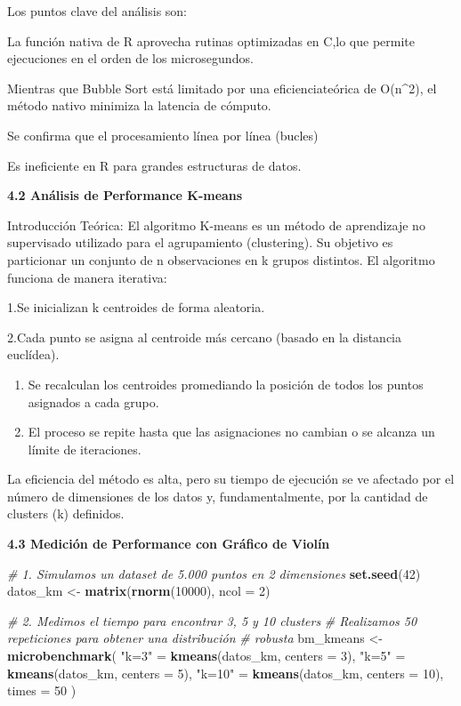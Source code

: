 \documentclass[runningheads]{llncs}
\newenvironment{Shaded}{\begin{snugshade}}{\end{snugshade}}
\newcommand{\AttributeTok}[1]{\textcolor[rgb]{0.13,0.29,0.53}{#1}}
\newcommand{\CommentTok}[1]{\textcolor[rgb]{0.56,0.35,0.01}{\textit{#1}}}
\newcommand{\DecValTok}[1]{\textcolor[rgb]{0.00,0.00,0.81}{#1}}
\newcommand{\FunctionTok}[1]{\textcolor[rgb]{0.13,0.29,0.53}{\textbf{#1}}}
\newcommand{\NormalTok}[1]{#1}
\newcommand{\OtherTok}[1]{\textcolor[rgb]{0.56,0.35,0.01}{#1}}
\newcommand{\StringTok}[1]{\textcolor[rgb]{0.31,0.60,0.02}{#1}}
\begin{document}
Los puntos clave del análisis son:

La función nativa de R aprovecha rutinas optimizadas en C,lo que permite
ejecuciones en el orden de los microsegundos.

Mientras que Bubble Sort está limitado por una eficienciateórica de
O(n\^{}2), el método nativo minimiza la latencia de cómputo.

Se confirma que el procesamiento línea por línea (bucles)

Es ineficiente en R para grandes estructuras de datos.

\textbf{4.2 Análisis de Performance K-means}

Introducción Teórica: El algoritmo K-means es un método de aprendizaje
no supervisado utilizado para el agrupamiento (clustering). Su objetivo
es particionar un conjunto de n observaciones en k grupos distintos. El
algoritmo funciona de manera iterativa:

1.Se inicializan k centroides de forma aleatoria.

2.Cada punto se asigna al centroide más cercano (basado en la distancia
euclídea).

\begin{enumerate}
\def\labelenumi{\arabic{enumi}.}
\setcounter{enumi}{2}
\item
  Se recalculan los centroides promediando la posición de todos los
  puntos asignados a cada grupo.
\item
  El proceso se repite hasta que las asignaciones no cambian o se
  alcanza un límite de iteraciones.
\end{enumerate}

La eficiencia del método es alta, pero su tiempo de ejecución se ve
afectado por el número de dimensiones de los datos y, fundamentalmente,
por la cantidad de clusters (k) definidos.

\textbf{4.3 Medición de Performance con Gráfico de Violín}

\begin{Shaded}
\begin{Highlighting}[]
\CommentTok{\# 1. Simulamos un dataset de 5.000 puntos en 2 dimensiones}
\FunctionTok{set.seed}\NormalTok{(}\DecValTok{42}\NormalTok{)}
\NormalTok{datos\_km }\OtherTok{\textless{}{-}} \FunctionTok{matrix}\NormalTok{(}\FunctionTok{rnorm}\NormalTok{(}\DecValTok{10000}\NormalTok{), }\AttributeTok{ncol =} \DecValTok{2}\NormalTok{)}

\CommentTok{\# 2. Medimos el tiempo para encontrar 3, 5 y 10 clusters}
\CommentTok{\# Realizamos 50 repeticiones para obtener una distribución}
\CommentTok{\# robusta}
\NormalTok{bm\_kmeans }\OtherTok{\textless{}{-}} \FunctionTok{microbenchmark}\NormalTok{(}
  \StringTok{"k=3"} \OtherTok{=} \FunctionTok{kmeans}\NormalTok{(datos\_km, }\AttributeTok{centers =} \DecValTok{3}\NormalTok{),}
  \StringTok{"k=5"} \OtherTok{=} \FunctionTok{kmeans}\NormalTok{(datos\_km, }\AttributeTok{centers =} \DecValTok{5}\NormalTok{),}
  \StringTok{"k=10"} \OtherTok{=} \FunctionTok{kmeans}\NormalTok{(datos\_km, }\AttributeTok{centers =} \DecValTok{10}\NormalTok{),}
  \AttributeTok{times =} \DecValTok{50}
\NormalTok{)}
\end{Highlighting}
\end{Shaded}
\end{document}
